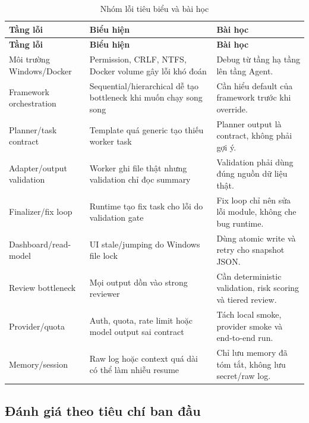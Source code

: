 \documentclass[12pt,a4paper]{article}
\begin{document}
\begin{longtable}{p{}p{}p{}}
\caption{Nhóm lỗi tiêu biểu và bài học}\\
\toprule
\textbf{Tầng lỗi} & \textbf{Biểu hiện} & \textbf{Bài học} \\
\midrule
\endfirsthead
\toprule
\textbf{Tầng lỗi} & \textbf{Biểu hiện} & \textbf{Bài học} \\
\midrule
\endhead
Môi trường Windows/Docker & Permission, CRLF, NTFS, Docker volume gây lỗi khó đoán & Debug từ tầng hạ tầng lên tầng Agent. \\
Framework orchestration & Sequential/hierarchical dễ tạo bottleneck khi muốn chạy song song & Cần hiểu default của framework trước khi override. \\
Planner/task contract & Template quá generic tạo thiếu worker task & Planner output là contract, không phải gợi ý. \\
Adapter/output validation & Worker ghi file thật nhưng validation chỉ đọc summary & Validation phải dùng đúng nguồn dữ liệu thật. \\
Finalizer/fix loop & Runtime tạo fix task cho lỗi do validation gate & Fix loop chỉ nên sửa lỗi module, không che bug runtime. \\
Dashboard/read-model & UI stale/jumping do Windows file lock & Dùng atomic write và retry cho snapshot JSON. \\
Review bottleneck & Mọi output dồn vào strong reviewer & Cần deterministic validation, risk scoring và tiered review. \\
Provider/quota & Auth, quota, rate limit hoặc model output sai contract & Tách local smoke, provider smoke và end-to-end run. \\
Memory/session & Raw log hoặc context quá dài có thể làm nhiễu resume & Chỉ lưu memory đã tóm tắt, không lưu secret/raw log. \\
\bottomrule
\end{longtable}

\subsection{Đánh giá theo tiêu chí ban đầu}
\end{document}
